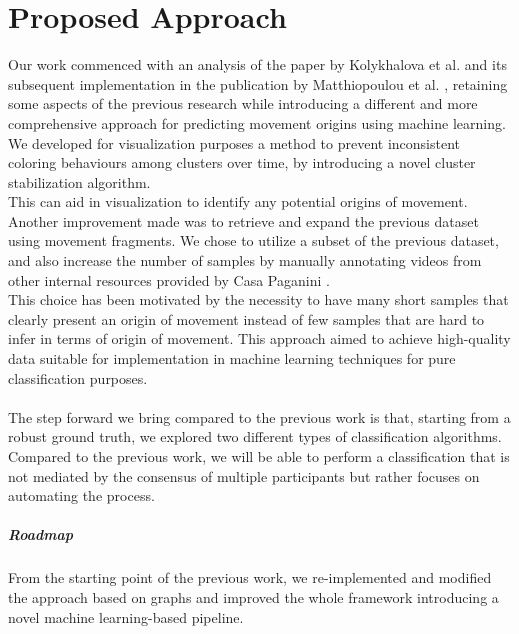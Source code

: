 \chapter{Proposed Approach}
Our work commenced with an analysis of the paper by Kolykhalova et al. \cite{kolykhalova:2020} and its subsequent implementation in the publication by Matthiopoulou et al. \cite{inproceedings_matteopropoli}, 
retaining some aspects of the previous research while introducing a different and more comprehensive approach for predicting movement origins using machine learning.\\

We developed for visualization purposes a method to prevent inconsistent coloring behaviours among clusters over time, by introducing a novel cluster stabilization algorithm.\\
This can aid in visualization to identify any potential origins of movement.\\

Another improvement made was to retrieve and expand the previous dataset using movement fragments. 
We chose to utilize a subset of the previous dataset, and also increase the number of samples by manually annotating videos from other internal resources provided by Casa Paganini \cite{casaPaganini}.\\ 
This choice has been motivated by the necessity to have many short samples that clearly present an origin of movement instead of few samples that are hard to infer in terms of origin of movement. 
This approach aimed to achieve high-quality data suitable for implementation in machine learning techniques for pure classification purposes.\\
\\
The step forward we bring compared to the previous work is that, starting from a robust ground truth, we explored two different types of classification algorithms.
Compared to the previous work, we will be able to perform a classification that is not mediated by the consensus of multiple participants but rather focuses on automating the process.

\paragraph{Roadmap}
From the starting point of the previous work, we re-implemented and modified the approach based on graphs and improved the whole framework introducing a novel machine learning-based pipeline.

